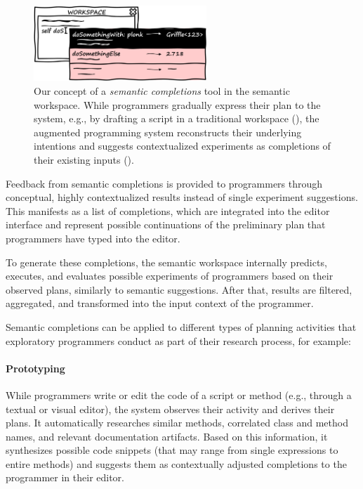 \begin{figure}
	\centering
	\includegraphics[width=0.58\textwidth]{02_workspace/completions.png}
	\caption[Our concept of a \emph{semantic completions} tool in the semantic workspace.]{
		Our concept of a \emph{semantic completions} tool in the semantic workspace.
		While programmers gradually express their plan to the system, e.g., by drafting a script in a traditional workspace (\bold{\textcolor{gray}{gray}}), the augmented programming system reconstructs their underlying intentions and suggests contextualized experiments as completions of their existing inputs (\bold{\textcolor[HTML]{c00000}{red}}).
	}
	\label{fig:approach/workspace/completions}
\end{figure}

Feedback from semantic completions is provided to programmers through conceptual, highly contextualized results instead of single experiment suggestions.
This manifests as a list of completions, which are integrated into the editor interface and represent possible continuations of the preliminary plan that programmers have typed into the editor.

To generate these completions, the semantic workspace internally predicts, executes, and evaluates possible experiments of programmers based on their observed plans, similarly to semantic suggestions.
After that, results are filtered, aggregated, and transformed into the input context of the programmer.

Semantic completions can be applied to different types of planning activities that exploratory programmers conduct as part of their research process, for example:

\paragraph{Prototyping}
While programmers write or edit the code of a script or method (e.g., through a textual or visual editor), the system observes their activity and derives their plans.
It automatically researches similar methods, correlated class and method names, and relevant documentation artifacts.
Based on this information, it synthesizes possible code snippets (that may range from single expressions to entire methods) and suggests them as contextually adjusted completions to the programmer in their editor.

